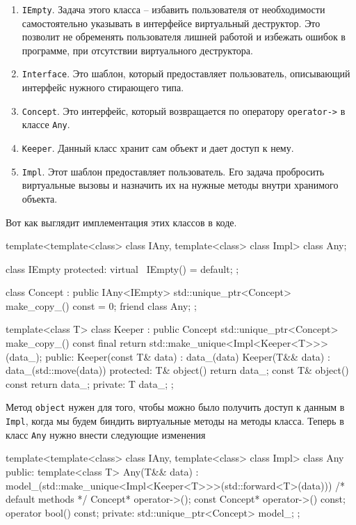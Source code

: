 \begin{enumerate}
\item \verb"IEmpty".
Задача этого класса -- избавить пользователя от необходимости самостоятельно указывать в интерфейсе виртуальный деструктор.
Это позволит не обременять пользователя лишней работой и избежать ошибок в программе, при отсутствии виртуального деструктора.

\item \verb"Interface".
Это шаблон, который предоставляет пользователь, описывающий интерфейс нужного стирающего типа.

\item \verb"Concept".
Это интерфейс, который возвращается по оператору \verb"operator->" в классе \verb"Any".

\item \verb"Keeper".
Данный класс хранит сам объект и дает доступ к нему.

\item \verb"Impl".
Этот шаблон предоставляет пользователь.
Его задача пробросить виртуальные вызовы и назначить их на нужные методы внутри хранимого объекта.
\end{enumerate}
Вот как выглядит имплементация этих классов в коде.
\begin{cppcode}
template<template<class> class IAny, template<class> class Impl>
class Any;

class IEmpty {
protected:
  virtual ~IEmpty() = default;
};

class Concept : public IAny<IEmpty> {
  std::unique_ptr<Concept> make_copy_() const = 0;
  friend class Any;
};

template<class T>
class Keeper : public Concept {
  std::unique_ptr<Concept> make_copy_() const final {
    return std::make_unique<Impl<Keeper<T>>>(data_);
  }
public:
  Keeper(const T& data) : data_(data) {}
  Keeper(T&& data) : data_(std::move(data)) {}
protected:
  T& object() { return data_; }  
  const T& object() const { return data_; }
private:
  T data_;
};
\end{cppcode}
Метод \verb"object" нужен для того, чтобы можно было получить доступ к данным в \verb"Impl", когда мы будем биндить виртуальные методы на методы класса.
Теперь в класс \verb"Any" нужно внести следующие изменения
\begin{cppcode}
template<template<class> class IAny, template<class> class Impl>
class Any {
public:
  template<class T>
  Any(T&& data)
    : model_(std::make_unique<Impl<Keeper<T>>>(std::forward<T>(data))) {}
  /* default methods */
  Concept* operator->();
  const Concept* operator->() const;
  operator bool() const;
private:
  std::unique_ptr<Concept> model_;
};
\end{cppcode}
